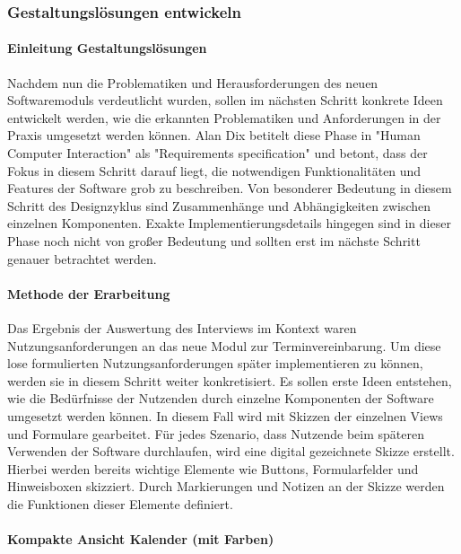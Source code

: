 \documentclass[12pt]{article}
\begin{document}
\subsubsection{Gestaltungslösungen entwickeln}

\paragraph{Einleitung Gestaltungslösungen}
Nachdem nun die Problematiken und Herausforderungen des neuen Softwaremoduls verdeutlicht wurden, sollen im nächsten Schritt konkrete Ideen entwickelt werden, wie die erkannten Problematiken und Anforderungen in der Praxis umgesetzt werden können. Alan Dix betitelt diese Phase in "Human Computer Interaction" als "Requirements specification" und betont, dass der Fokus in diesem Schritt darauf liegt, die notwendigen Funktionalitäten und Features der Software grob zu beschreiben. Von besonderer Bedeutung in diesem Schritt des Designzyklus sind Zusammenhänge und Abhängigkeiten zwischen einzelnen Komponenten. Exakte Implementierungsdetails hingegen sind in dieser Phase noch nicht von großer Bedeutung und sollten erst im nächste Schritt genauer betrachtet werden.

\paragraph{Methode der Erarbeitung}
Das Ergebnis der Auswertung des Interviews im Kontext waren Nutzungsanforderungen an das neue Modul zur Terminvereinbarung. Um diese lose formulierten Nutzungsanforderungen später implementieren zu können, werden sie in diesem Schritt weiter konkretisiert. Es sollen erste Ideen entstehen, wie die Bedürfnisse der Nutzenden durch einzelne Komponenten der Software umgesetzt werden können. In diesem Fall wird mit Skizzen der einzelnen Views und Formulare gearbeitet. Für jedes Szenario, dass Nutzende beim späteren Verwenden der Software durchlaufen, wird eine digital gezeichnete Skizze erstellt. Hierbei werden bereits wichtige Elemente wie Buttons, Formularfelder und Hinweisboxen skizziert. Durch Markierungen und Notizen an der Skizze werden die Funktionen dieser Elemente definiert.

\paragraph{Kompakte Ansicht Kalender (mit Farben)}
\end{document}
